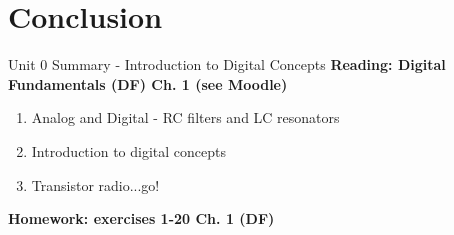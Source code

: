 \documentclass{beamer}
\begin{document}
\section{Conclusion}

\begin{frame}{Unit 0 Summary - Introduction to Digital Concepts}
\textbf{Reading: Digital Fundamentals (DF) Ch. 1 (see Moodle)}
\begin{enumerate}
\item Analog and Digital - RC filters and LC resonators
\item Introduction to digital concepts
\item Transistor radio...go!
\end{enumerate}
\textbf{Homework: exercises 1-20 Ch. 1 (DF)}
\end{frame}
\end{document}
